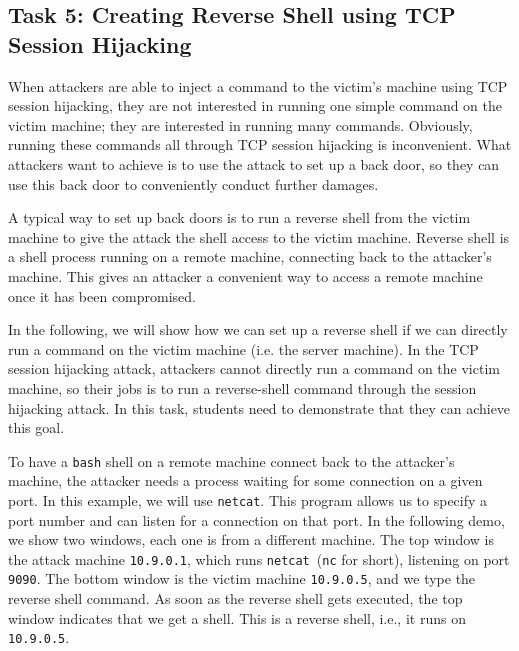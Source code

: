 \subsection{Task 5: Creating Reverse Shell using TCP Session Hijacking}

When attackers are able to inject a command to the victim's machine using
TCP session hijacking, they are not interested in running one simple
command on the victim machine; they are interested in running many
commands. Obviously, running these commands all through TCP session
hijacking is inconvenient. What attackers want to achieve is to use the
attack to set up a back door, so they can use this
back door to conveniently conduct further damages.

A typical way to set up back doors is to run a reverse shell from the
victim machine to give the attack the shell access to the victim machine.
Reverse shell is a shell process running on a remote machine, connecting
back to the attacker's machine. This gives an attacker a convenient way to
access a remote machine once it has been compromised. 


In the following, we will show how we can set up a reverse shell if we can
directly run a command on the victim machine (i.e. the server machine). 
In the TCP session hijacking attack, attackers cannot directly run a
command on the victim machine, so their jobs is to run a reverse-shell
command through the session hijacking attack. 
In this task, students need to demonstrate that they can achieve this goal.


To have a \texttt{bash} shell on a remote machine connect back to the attacker's machine, the
attacker needs a process waiting for some connection on a given port. In this example, we will
use \texttt{netcat}. This program allows us to specify a port
number and can listen for a connection on that port.
In the following demo, we show two windows, each one is from a 
different machine. The top window is the attack machine \texttt{10.9.0.1},  
which runs \texttt{netcat}~(\texttt{nc} for short), listening on port \texttt{9090}. 
The bottom window is the victim machine \texttt{10.9.0.5}, and 
we type the reverse shell command.
As soon as the reverse shell gets executed, the top window indicates 
that we get a shell. This is a reverse shell, i.e., it runs on \texttt{10.9.0.5}.  


